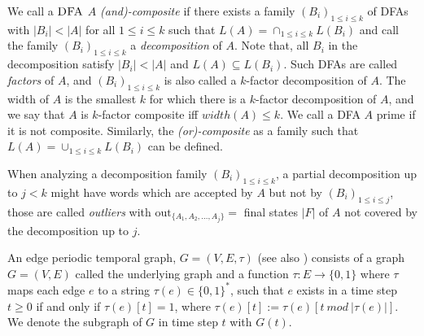 We call a $\textsc{DFA}$ $A$ \textit{(and)-composite} if there exists a family $(B_i)_{1 \leq i \leq k}$ of DFAs with $|B_i| < |A|$ for all $1 \leq i \leq k$ such that $L(A) = \cap_{1\leq i \leq k} L(B_i)$ and call the family $(B_i)_{1\leq i \leq k}$ a \textit{decomposition} of $A$. Note that, all $B_i$ in the decomposition satisfy $|B_i| < |A|$ and $L(A) \subseteq L(B_i)$. Such DFAs are called \textit{factors} of $A$, and $(B_i)_{1\leq i \leq k}$ is also called a $k$-factor decomposition of $A$. The
width of $A$ is the smallest $k$ for which there is a $k$-factor decomposition of $A$, and we say that $A$ is $k$-factor composite iff $width(A) \leq k$. We call a DFA $A$ prime if it is not composite. Similarly, the \textit{(or)-composite} as a family such that  $L(A) = \cup_{1\leq i \leq k} L(B_i)$ can be defined.

When analyzing a decomposition family $(B_i)_{1 \leq i \leq k}$, a partial decomposition up to $j < k$ might have words which are accepted by $A$ but not by $(B_i)_{1 \leq i \leq j}$, those are called \textit{outliers} with $\text{out}_{\{A_1,A_2, \dots, A_j\}} = $ final states $|F|$ of $A$ not covered by the decomposition up to $j$. 

An edge periodic temporal graph, $G = (V, E, \tau)$ (see also \cite{erlebach2020game}) consists of a graph $G = (V, E)$ called the underlying graph and a function $\tau : E \rightarrow \{0, 1\}$ where $\tau$ maps each edge $e$ to a string $\tau(e) \in \{0, 1\}^*$, such that $e$ exists in a time step $t \geq 0$ if and only if $\tau(e)[t] = 1$, where $\tau(e)[t] := \tau(e)[t~ mod~ |\tau(e)|]$. We denote the subgraph of $G$ in time step $t$ with $G(t)$.

